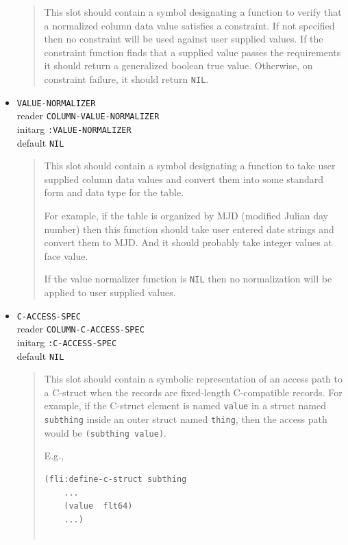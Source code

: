 \documentclass[article,oneside]{memoir}
\begin{document}
\begin{itemize}
\begin{quote}
This slot should contain a symbol designating a function to verify that a normalized column data value satisfies a constraint. If not specified then no constraint will be used against user supplied values. If the constraint function finds that a supplied value passes the requirements it should return a generalized boolean true value. Otherwise, on constraint failure, it should return \texttt{NIL}.
\end{quote}

\item \texttt{VALUE-NORMALIZER} \\ 
reader \texttt{COLUMN-VALUE-NORMALIZER} \\ 
initarg \texttt{:VALUE-NORMALIZER} \\ 
default \texttt{NIL}

\begin{quote}
This slot should contain a symbol designating a function to take user supplied column data values and convert them into some standard form and data type for the table. 

For example, if the table is organized by MJD (modified Julian day number) then this function should take user entered date strings and convert them to MJD. And it should probably take integer values at face value. 

If the value normalizer function is \texttt{NIL} then no normalization will be applied to user supplied values.
\end{quote}

\item \texttt{C-ACCESS-SPEC} \\ 
reader \texttt{COLUMN-C-ACCESS-SPEC} \\ 
initarg \texttt{:C-ACCESS-SPEC} \\ 
default \texttt{NIL}

\begin{quote}
This slot should contain a symbolic representation of an access path to a C-struct when the records are fixed-length C-compatible records. For example, if the C-struct element is named \texttt{value} in a struct named \texttt{subthing} inside an outer struct named \texttt{thing}, then the access path would be \texttt{(subthing value)}.

E.g., 

\begin{verbatim}
(fli:define-c-struct subthing
	...
	(value  flt64)
	...)
	

\end{verbatim}
\end{quote}
\end{itemize}
\end{document}

